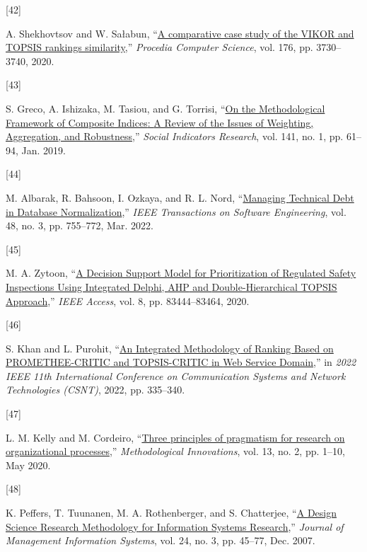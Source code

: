 \documentclass[
  journal,
]{IEEEtran}%
\newlength{\cslhangindent}
\newlength{\csllabelwidth}
\newenvironment{CSLReferences}[2] %
 {\begin{list}{}{%
  \setlength{\itemindent}{0pt}
  \setlength{\leftmargin}{0pt}
  \setlength{\parsep}{0pt}
  \ifodd #1
   \setlength{\leftmargin}{\cslhangindent}
   \setlength{\itemindent}{-1\cslhangindent}
  \fi
  \setlength{\itemsep}{#2\baselineskip}}}
 {\end{list}}
\newcommand{\CSLLeftMargin}[1]{\parbox[t]{\csllabelwidth}{\strut#1\strut}}
\newcommand{\CSLRightInline}[1]{\parbox[t]{\linewidth - \csllabelwidth}{\strut#1\strut}}
\begin{document}
\begin{CSLReferences}{0}{0}
\CSLLeftMargin{{[}42{]} }%
\CSLRightInline{A. Shekhovtsov and W. Sałabun,
{``\href{https://doi.org/10.1016/j.procs.2020.09.014}{A comparative case
study of the {VIKOR} and {TOPSIS} rankings similarity},''}
\emph{Procedia Computer Science}, vol. 176, pp. 3730--3740, 2020. }

\CSLLeftMargin{{[}43{]} }%
\CSLRightInline{S. Greco, A. Ishizaka, M. Tasiou, and G. Torrisi,
{``\href{https://doi.org/10.1007/s11205-017-1832-9}{On the
{Methodological Framework} of {Composite Indices}: {A Review} of the
{Issues} of {Weighting}, {Aggregation}, and {Robustness}},''}
\emph{Social Indicators Research}, vol. 141, no. 1, pp. 61--94, Jan.
2019. }

\CSLLeftMargin{{[}44{]} }%
\CSLRightInline{M. Albarak, R. Bahsoon, I. Ozkaya, and R. L. Nord,
{``\href{https://doi.org/10.1109/TSE.2020.3001339}{Managing {Technical
Debt} in {Database Normalization}},''} \emph{IEEE Transactions on
Software Engineering}, vol. 48, no. 3, pp. 755--772, Mar. 2022. }

\CSLLeftMargin{{[}45{]} }%
\CSLRightInline{M. A. Zytoon,
{``\href{https://doi.org/10.1109/ACCESS.2020.2991179}{A {Decision
Support Model} for {Prioritization} of {Regulated Safety Inspections
Using Integrated Delphi}, {AHP} and {Double-Hierarchical TOPSIS
Approach}},''} \emph{IEEE Access}, vol. 8, pp. 83444--83464, 2020. }

\CSLLeftMargin{{[}46{]} }%
\CSLRightInline{S. Khan and L. Purohit,
{``\href{https://doi.org/10.1109/CSNT54456.2022.9787620}{An {Integrated
Methodology} of {Ranking Based} on {PROMETHEE-CRITIC} and
{TOPSIS-CRITIC} in {Web Service Domain}},''} in \emph{2022 {IEEE} 11th
{International Conference} on {Communication Systems} and {Network
Technologies} ({CSNT})}, 2022, pp. 335--340. }

\CSLLeftMargin{{[}47{]} }%
\CSLRightInline{L. M. Kelly and M. Cordeiro,
{``\href{https://doi.org/10.1177/2059799120937242}{Three principles of
pragmatism for research on organizational processes},''}
\emph{Methodological Innovations}, vol. 13, no. 2, pp. 1--10, May 2020.
}

\CSLLeftMargin{{[}48{]} }%
\CSLRightInline{K. Peffers, T. Tuunanen, M. A. Rothenberger, and S.
Chatterjee, {``\href{https://doi.org/10.2753/MIS0742-1222240302}{A
{Design Science Research Methodology} for {Information Systems
Research}},''} \emph{Journal of Management Information Systems}, vol.
24, no. 3, pp. 45--77, Dec. 2007. }


\end{CSLReferences}
\end{document}
